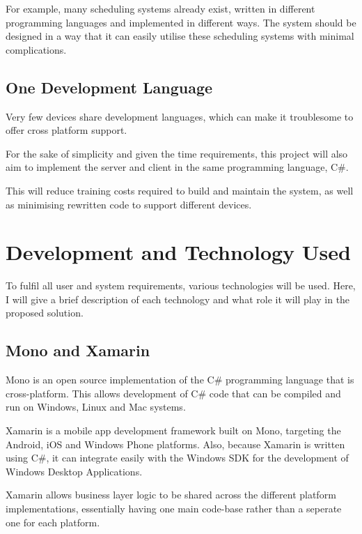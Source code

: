 For example, many scheduling systems already exist, written in different programming languages and implemented in different ways. The system should be designed in a way that it can easily utilise these scheduling systems with minimal complications.

\subsection{One Development Language}

Very few devices share development languages, which can make it troublesome to offer cross platform support.

For the sake of simplicity and given the time requirements, this project will also aim to implement the server and client in the same programming language, C\#.

This will reduce training costs required to build and maintain the system, as well as minimising rewritten code to support different devices.


\section{Development and Technology Used}

To fulfil all user and system requirements, various technologies will be used. Here, I will give a brief description of each technology and what role it will play in the proposed solution.

\subsection{Mono and Xamarin}

Mono is an open source implementation of the C\# programming language that is cross-platform. This allows development of C\# code that can be compiled and run on Windows, Linux and Mac systems.

Xamarin is a mobile app development framework built on Mono, targeting the Android, iOS and Windows Phone platforms. Also, because Xamarin is written using C\#, it can integrate easily with the Windows SDK for the development of Windows Desktop Applications. 

Xamarin allows business layer logic to be shared across the different platform implementations, essentially having one main code-base rather than a seperate one for each platform.

